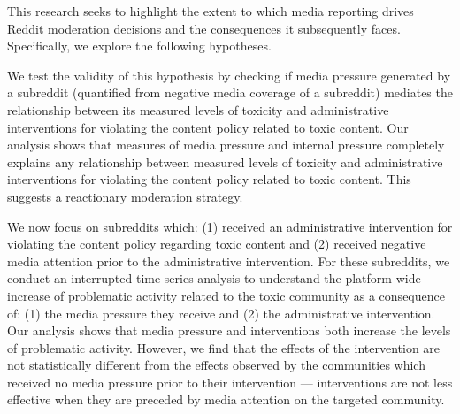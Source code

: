  This research seeks to highlight the extent to which
media reporting drives Reddit moderation decisions and the consequences it
subsequently faces. Specifically, we explore the following hypotheses.

 We test the validity of
this hypothesis by checking if media pressure generated by a subreddit
(quantified from negative media coverage of a subreddit) mediates the
relationship between its measured levels of toxicity and administrative
interventions for violating the content policy related to toxic content. Our
analysis shows that measures of media pressure and internal pressure completely
explains any relationship between measured levels of toxicity and
administrative interventions for violating the content policy related to toxic
content. This suggests a reactionary moderation strategy.

% 
 We
now focus on subreddits which: (1) received an administrative intervention for
violating the content policy regarding toxic content and (2) received negative
media attention prior to the administrative intervention. 
For these subreddits, we conduct an interrupted time series analysis to
understand the platform-wide increase of problematic activity related to the
toxic community as a consequence of: (1) the media pressure they receive and
(2) the administrative intervention. Our analysis shows that
media pressure and interventions both increase the levels of problematic
activity. However, we find that the effects of the intervention are not
statistically different from the effects observed by the communities which
received no media pressure prior to their intervention --- \ie interventions
are not less effective when they are preceded by media attention on the
targeted community.

